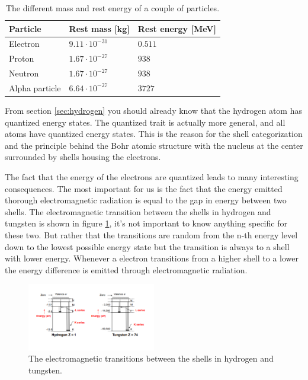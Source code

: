 \documentclass[jmp, amsmath, amssymb, reprint]{article}
\numberwithin{equation}{section}
\begin{document}
\begin{multicols}{2}
\begin{table}[H]
  \begin{center}
    \begin{tabular}{| l | l | l |}
   	\hline
	Particle & Rest mass [kg] & Rest energy [MeV]\\ \hline
	Electron & \(9.11\cdot10^{-31}\) & \(0.511\)\\
	Proton & \(1.67\cdot10^{-27}\) & \(938\)\\
	Neutron & \(1.67\cdot10^{-27}\) & \(938\)\\
	Alpha particle & \(6.64\cdot10^{-27}\) & \(3727\)\\ \hline
	\end{tabular}
    \caption{The different mass and rest energy of a couple of particles.}
    \label{tabel:3}
  \end{center}
\end{table}

From section \ref{sec:hydrogen} you should already know that the hydrogen atom has quantized energy states. The quantized trait is actually more general, and all atoms have quantized energy states. This is the reason for the shell categorization and the principle behind the Bohr atomic structure with the nucleus at the center surrounded by shells housing the electrons.

The fact that the energy of the electrons are quantized leads to many interesting consequences. The most important for us is the fact that the energy emitted thorough electromagnetic radiation is equal to the gap in energy between two shells. The electromagnetic transition between the shells in hydrogen and tungsten is shown in figure \ref{fig:el_transition}, it's not important to know anything specific for these two. But rather that the transitions are random from the n-th energy level down to the lowest possible energy state but the transition is always to a shell with lower energy. Whenever a electron transitions from a higher shell to a lower the energy difference is emitted through electromagnetic radiation.

\begin{figure}[H]
	\centering
  	\includegraphics[width=0.50\textwidth]{electromagnetic_transistion.png}
	\caption{The electromagnetic transitions between the shells in hydrogen and tungsten.}
	\label{fig:el_transition}
\end{figure}


\end{multicols}
\end{document}
